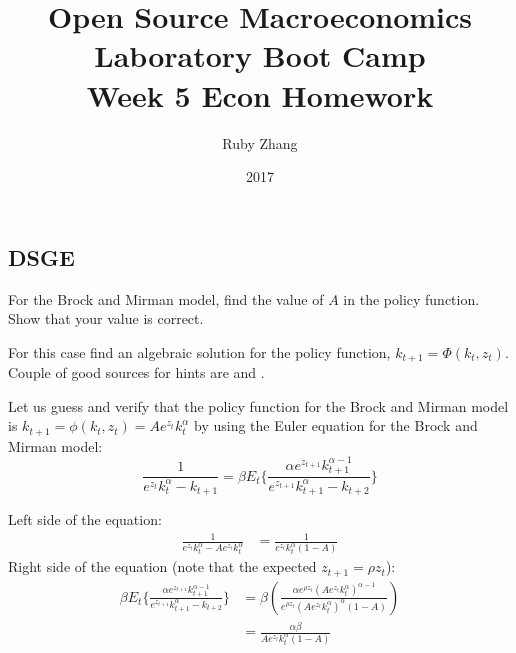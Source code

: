 \documentclass[letterpaper,11pt]{article}
\theoremstyle{definition}
\begin{document}
\begin{titlepage}
	\title{Open Source Macroeconomics Laboratory Boot Camp \\ Week 5 Econ Homework}
	\author{Ruby Zhang}
	\date{\LARGE{2017}}
	\maketitle
\end{titlepage}

\begin{spacing}{1.5}


\section*{DSGE}\label{DSGE_HW}

	\begin{Exercise} \label{DSGE_HW_BM_FindA}
		For the Brock and Mirman model, find the value of $A$ in the policy function.  Show that your value is correct.

		For this case find an algebraic solution for the policy function, $k_{t+1} = \Phi (k_t,z_t)$.  Couple of good sources for hints are \citet[exercise 2.2, p. 12]{StokeyLucas1989} and \citet[exercise 1.1, p. 47]{Sargent1987}.
	\end{Exercise}

	Let us guess and verify that the policy function for the Brock and Mirman model is $k_{t+1}=\phi(k_t, z_t) = Ae^{z_t}k_t^{\alpha}$ by using the Euler equation for the Brock and Mirman model:
	\begin{equation*}
		\frac{1}{e^{z_t}k_t^\alpha-k_{t+1}} = \beta E_t\{\frac{\alpha e^{z_{t+1}} k_{t+1}^{\alpha-1}}{e^{z_{t+1}}k_{t+1}^\alpha-k_{t+2}}\}
	\end{equation*}

	Left side of the equation:
	\begin{align*}
		\frac{1}{e^{z_t}k_t^\alpha-Ae^{z_t}k_t^{\alpha}} &= \frac{1}{e^{z_t}k_t^{\alpha}(1-A)}
	\end{align*}
	Right side of the equation (note that the expected $z_{t+1} = \rho z_t$):
	\begin{align*}
		\beta E_t\{\frac{\alpha e^{z_{t+1}} k_{t+1}^{\alpha-1}}{e^{z_{t+1}}k_{t+1}^\alpha-k_{t+2}}\} &= \beta(\frac{\alpha e^{\rho z_t}(Ae^{z_t}k_t^\alpha)^{\alpha-1}}{e^{\rho z_t}(Ae^{z_t}k_t^\alpha)^{\alpha}(1-A)}) \\
		&= \frac{\alpha\beta}{Ae^{z_t}k_t^\alpha(1-A)}
	\end{align*}


\end{spacing}
\end{document}
